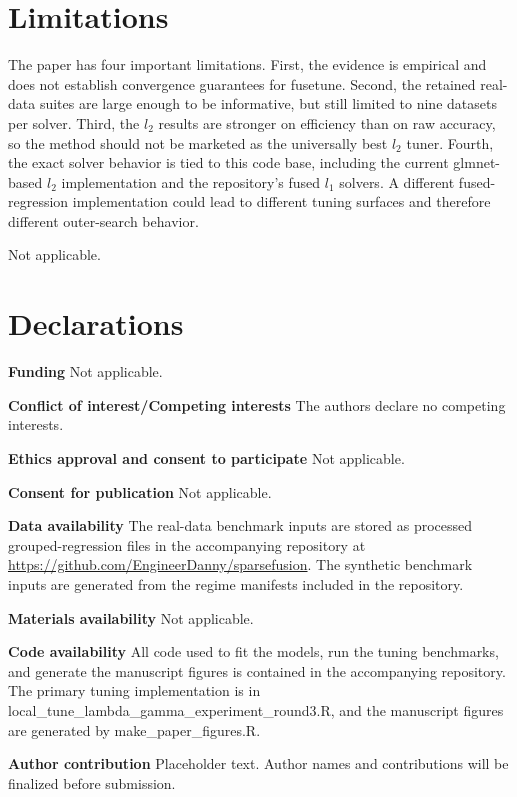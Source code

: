 \documentclass[pdflatex,iicol,sn-mathphys-num]{sn-jnl}
\newcommand{\codeid}{\texttt{fusetune}}
\def\texttt#1{#1}%
\def\codeid{fusetune}%
\def\ell{l}%
\begin{document}
\section{Limitations}
The paper has four important limitations. First, the evidence is empirical and does not establish convergence guarantees for \codeid. Second, the retained real-data suites are large enough to be informative, but still limited to nine datasets per solver. Third, the \(\ell_2\) results are stronger on efficiency than on raw accuracy, so the method should not be marketed as the universally best \(\ell_2\) tuner. Fourth, the exact solver behavior is tied to this code base, including the current \texttt{glmnet}-based \(\ell_2\) implementation and the repository's fused \(\ell_1\) solvers. A different fused-regression implementation could lead to different tuning surfaces and therefore different outer-search behavior.

Not applicable.

\section*{Declarations}
\textbf{Funding} Not applicable.

\textbf{Conflict of interest/Competing interests} The authors declare no competing interests.

\textbf{Ethics approval and consent to participate} Not applicable.

\textbf{Consent for publication} Not applicable.

\textbf{Data availability} The real-data benchmark inputs are stored as processed grouped-regression files in the accompanying repository at \url{https://github.com/EngineerDanny/sparsefusion}. The synthetic benchmark inputs are generated from the regime manifests included in the repository.

\textbf{Materials availability} Not applicable.

\textbf{Code availability} All code used to fit the models, run the tuning benchmarks, and generate the manuscript figures is contained in the accompanying repository. The primary tuning implementation is in \texttt{local\_tune\_lambda\_gamma\_experiment\_round3.R}, and the manuscript figures are generated by \texttt{make\_paper\_figures.R}.

\textbf{Author contribution} Placeholder text. Author names and contributions will be finalized before submission.
\end{document}
